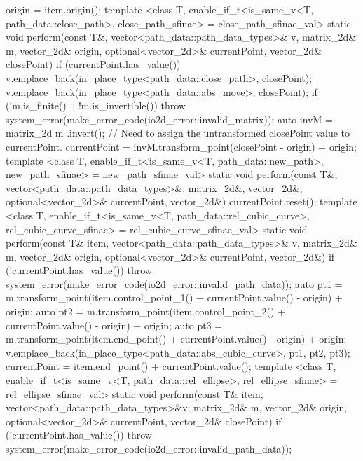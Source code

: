 \begin{codeblock}
{{{        origin = item.origin();
      }
      template <class T, enable_if_t<is_same_v<T, 
        path_data::close_path>, close_path_sfinae> = close_path_sfinae_val>
      static void perform(const T&, vector<path_data::path_data_types>& v, 
        matrix_2d& m, vector_2d& origin, optional<vector_2d>& currentPoint, 
        vector_2d& closePoint) {
        if (currentPoint.has_value()) {
          v.emplace_back(in_place_type<path_data::close_path>, closePoint);
          v.emplace_back(in_place_type<path_data::abs_move>,
            closePoint);
          if (!m.is_finite() || !m.is_invertible()) {
            throw system_error(make_error_code(io2d_error::invalid_matrix));
          }
          auto invM = matrix_2d{ m }.invert();
          // Need to assign the untransformed closePoint value to currentPoint.
          currentPoint = invM.transform_point(closePoint - origin) + origin;
        }
      }
      template <class T, enable_if_t<is_same_v<T, path_data::new_path>, 
        new_path_sfinae> = new_path_sfinae_val>
      static void perform(const T&, vector<path_data::path_data_types>&, 
        matrix_2d&, vector_2d&, optional<vector_2d>& currentPoint, vector_2d&) {
        currentPoint.reset();
      }
      template <class T, enable_if_t<is_same_v<T, path_data::rel_cubic_curve>, 
        rel_cubic_curve_sfinae> = rel_cubic_curve_sfinae_val>
      static void perform(const T& item, vector<path_data::path_data_types>& v, 
        matrix_2d& m, vector_2d& origin, optional<vector_2d>& currentPoint, 
        vector_2d&) {
        if (!currentPoint.has_value()) {
          throw system_error(make_error_code(io2d_error::invalid_path_data));
        }
        auto pt1 = m.transform_point(item.control_point_1() + 
          currentPoint.value() - origin) + origin;
        auto pt2 = m.transform_point(item.control_point_2() + 
          currentPoint.value() - origin) + origin;
        auto pt3 = m.transform_point(item.end_point() + currentPoint.value() - 
          origin) + origin;
        v.emplace_back(in_place_type<path_data::abs_cubic_curve>,
          pt1, pt2, pt3);
        currentPoint = item.end_point() + currentPoint.value();
      }
      template <class T, enable_if_t<is_same_v<T, path_data::rel_ellipse>, 
        rel_ellipse_sfinae> = rel_ellipse_sfinae_val>
      static void perform(const T& item, vector<path_data::path_data_types>&v, 
        matrix_2d& m, vector_2d& origin, optional<vector_2d>& currentPoint, 
        vector_2d& closePoint) {
        if (!currentPoint.has_value()) {
          throw system_error(make_error_code(io2d_error::invalid_path_data));
}}}}
\end{codeblock}
